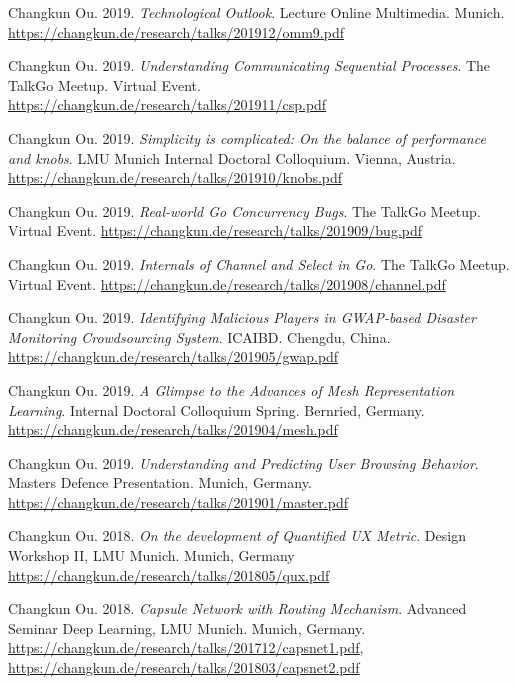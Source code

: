     \item{
      Changkun Ou. 2019.
      \emph{Technological Outlook}.
      Lecture Online Multimedia. Munich.
      \url{https://changkun.de/research/talks/201912/omm9.pdf}
    }
    \item{
      Changkun Ou. 2019.
      \emph{Understanding Communicating Sequential Processes}.
      The TalkGo Meetup. Virtual Event.
      \url{https://changkun.de/research/talks/201911/csp.pdf}
    }
    \item{
      Changkun Ou. 2019.
      \emph{Simplicity is complicated: On the balance of performance and knobs}.
      LMU Munich Internal Doctoral Colloquium. Vienna, Austria.
      \url{https://changkun.de/research/talks/201910/knobs.pdf}
    }
    \item{
      Changkun Ou. 2019.
      \emph{Real-world Go Concurrency Bugs}.
      The TalkGo Meetup. Virtual Event.
      \url{https://changkun.de/research/talks/201909/bug.pdf}
    }
    \item{
      Changkun Ou. 2019.
      \emph{Internals of Channel and Select in Go}.
      The TalkGo Meetup. Virtual Event.
      \url{https://changkun.de/research/talks/201908/channel.pdf}
    }
    \item{
      Changkun Ou. 2019.
      \emph{Identifying Malicious Players in GWAP-based Disaster Monitoring Crowdsourcing System}.
      ICAIBD. Chengdu, China.
      \url{https://changkun.de/research/talks/201905/gwap.pdf}
    }
    \item{
      Changkun Ou. 2019.
      \emph{A Glimpse to the Advances of Mesh Representation Learning}.
      Internal Doctoral Colloquium Spring. Bernried, Germany.
      \url{https://changkun.de/research/talks/201904/mesh.pdf}
    }
    \item{
      Changkun Ou. 2019.
      \emph{Understanding and Predicting User Browsing Behavior}.
      Masters Defence Presentation. Munich, Germany.
      \url{https://changkun.de/research/talks/201901/master.pdf}
    }
    \item{
      Changkun Ou. 2018.
      \emph{On the development of Quantified UX Metric}.
      Design Workshop II, LMU Munich. Munich, Germany
      \url{https://changkun.de/research/talks/201805/qux.pdf}
    }
    \item{
      Changkun Ou. 2018.
      \emph{Capsule Network with Routing Mechanism}.
      Advanced Seminar Deep Learning, LMU Munich. Munich, Germany.
      \url{https://changkun.de/research/talks/201712/capsnet1.pdf},
      \url{https://changkun.de/research/talks/201803/capsnet2.pdf}
    }
